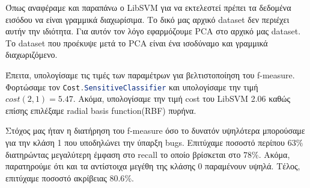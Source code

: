 Όπως αναφέραμε και παραπάνω ο LibSVM για να εκτελεστεί πρέπει τα δεδομένα εισόδου να είναι γραμμικά διαχωρίσιμα.
Το δικό μας αρχικό dataset δεν περιέχει αυτήν την ιδιότητα.
Για αυτόν τον λόγο εφαρμόζουμε PCA στο αρχικό μας dataset.
Το dataset που προέκυψε μετά το PCA είναι ένα ισοδύναμο και γραμμικά διαχωριζόμενο.

\begin{sloppypar}
Έπειτα, υπολογίσαμε τις τιμές των παραμέτρων για βελτιστοποίηση του f-measure.
Φορτώσαμε τον \lstinline[language=Java]!Cost.SensitiveClassifier!
και υπολογίσαμε την τιμή $cost(2,1)=5.47$.
Ακόμα, υπολογίσαμε την τιμή cost του LibSVM 2.06 καθώς επίσης επιλέξαμε radial basis function(RBF) πυρήνα.
\end{sloppypar}

Στόχος μας ήταν η διατήρηση του f-measure όσο το δυνατόν υψηλότερα μπορούσαμε για την κλάση 1 που υποδηλώνει την ύπαρξη bugs.
Επιτύχαμε ποσοστό περίπου $63\%$ διατηρώντας μεγαλύτερη έμφαση στο recall το οποίο βρίσκεται στο $78\%$.
Ακόμα, παρατηρούμε ότι και τα αντίστοιχα μεγέθη της κλάσης 0 παραμένουν υψηλά.
Τέλος, επιτύχαμε ποσοστό ακρίβειας $80.6\%$.
